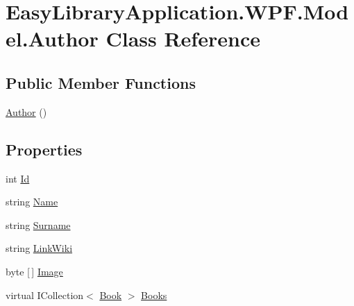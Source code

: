 \hypertarget{class_easy_library_application_1_1_w_p_f_1_1_model_1_1_author}{}\section{Easy\+Library\+Application.\+W\+P\+F.\+Model.\+Author Class Reference}
\label{class_easy_library_application_1_1_w_p_f_1_1_model_1_1_author}
\subsection*{Public Member Functions}
\begin{DoxyCompactItemize}
\item 
\mbox{\hyperlink{class_easy_library_application_1_1_w_p_f_1_1_model_1_1_author_a367736bc754091c5e0a8d971f0b58785}{Author}} ()
\end{DoxyCompactItemize}
\subsection*{Properties}
\begin{DoxyCompactItemize}
\item 
int \mbox{\hyperlink{class_easy_library_application_1_1_w_p_f_1_1_model_1_1_author_a89fd9b550da4cb95646060607cfb0369}{Id}}
\item 
string \mbox{\hyperlink{class_easy_library_application_1_1_w_p_f_1_1_model_1_1_author_abdfabb38d0c06f54bafa2be9a4a61343}{Name}}
\item 
string \mbox{\hyperlink{class_easy_library_application_1_1_w_p_f_1_1_model_1_1_author_a37de5602f808f364230a3e6ee9ee8b79}{Surname}}
\item 
string \mbox{\hyperlink{class_easy_library_application_1_1_w_p_f_1_1_model_1_1_author_a2cf9e9b3b5eb4a5e09d8babb4398e136}{Link\+Wiki}}
\item 
byte \mbox{[}$\,$\mbox{]} \mbox{\hyperlink{class_easy_library_application_1_1_w_p_f_1_1_model_1_1_author_aa110e1cc14e94f856160d959c534ce1f}{Image}}
\item 
virtual I\+Collection$<$ \mbox{\hyperlink{class_easy_library_application_1_1_w_p_f_1_1_model_1_1_book}{Book}} $>$ \mbox{\hyperlink{class_easy_library_application_1_1_w_p_f_1_1_model_1_1_author_af646d7013104a4e7a90c82f85fb16e9b}{Books}}
\end{DoxyCompactItemize}


